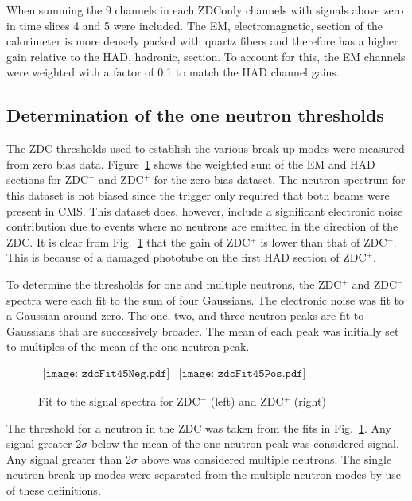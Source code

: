       When summing the 9 channels in each ZDC\DIFaddbegin \DIFadd{, }\DIFaddend only channels with signals above 
        zero in time slices 4 and 5 were included. 
      The EM, electromagnetic, section of the calorimeter is more densely 
        packed with quartz fibers and therefore has a higher gain relative to 
        the HAD, hadronic, section. 
      To account for this, the EM channels were weighted with
        a factor of 0.1 to match the HAD channel gains.

    \subsection{Determination of the one neutron thresholds}
      The ZDC thresholds used to establish the various break-up modes were 
        measured from zero bias data.
      Figure~\ref{fig:zdcM2Fit} shows the weighted sum of the EM and 
        HAD sections for  ZDC$^{-}$ and  ZDC$^{+}$ for the zero bias 
        dataset.
      The neutron spectrum for this dataset is not biased since the 
        trigger only required that both beams were present in CMS. 
      This dataset does, however, include a significant electronic noise contribution due
        to events where no neutrons are emitted in the direction of the ZDC.
      It is clear from Fig.~\ref{fig:zdcM2Fit} that the gain of  
        ZDC$^{+}$ is lower than that of ZDC$^{-}$. 
      This is because of a damaged phototube on the first HAD section 
        of ZDC$^{+}$.

      To determine the thresholds for one and multiple neutrons, the ZDC$^{+}$ 
        and ZDC$^{-}$ spectra were 
        each fit to the sum of four Gaussians. 
      The electronic \DIFaddbegin {}\DIFaddend noise was fit to a Gaussian around zero.
      The one, two, and three neutron peaks are fit to Gaussians that are 
        successively broader.
      The mean of each peak was initially set to multiples of the mean of the 
        one neutron peak. 
      \begin{figure}[!Hh]
        \centering
        $
          \begin{array}{cc}
            \texttt{[image: zdcFit45Neg.pdf]} &
            \texttt{[image: zdcFit45Pos.pdf]}
          \end{array} 
        $
        \caption{Fit to the signal spectra for ZDC$^{-}$ (left) and ZDC$^{+}$ 
          (right)}
        \label{fig:zdcM2Fit}
      \end{figure}
      The threshold for a neutron in the ZDC was taken from the fits in 
        Fig.~\ref{fig:zdcM2Fit}.
      Any signal greater 2$\sigma$ below the mean of the one neutron peak was 
        considered signal.
      Any signal greater than 2$\sigma$ above was considered multiple 
        neutrons.
      The single neutron break up modes were separated from the multiple 
        neutron modes by use of these definitions.

